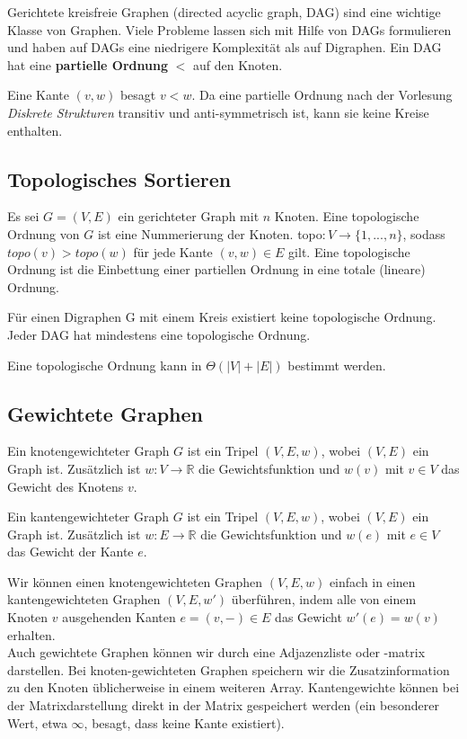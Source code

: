 \documentclass[12pt]{article}
\begin{document}
Gerichtete kreisfreie Graphen (directed acyclic graph, DAG) sind eine wichtige Klasse von Graphen. Viele Probleme lassen sich mit Hilfe von DAGs formulieren und haben auf DAGs eine niedrigere Komplexität als auf Digraphen. Ein DAG hat eine \textbf{partielle Ordnung} $<$ auf den Knoten.

Eine Kante $(v, w)$ besagt $v < w$. Da eine partielle Ordnung nach der Vorlesung \textit{Diskrete Strukturen} transitiv und anti-symmetrisch ist, kann sie keine Kreise enthalten.

\subsection{Topologisches Sortieren}

Es sei $G = (V, E)$ ein gerichteter Graph mit $n$ Knoten. Eine topologische Ordnung von $G$ ist eine Nummerierung der Knoten. topo$: V \rightarrow \{1, ..., n\}$, sodass $topo(v) > topo(w)$ für jede Kante $(v, w) \in E$ gilt. Eine topologische Ordnung ist die Einbettung einer partiellen Ordnung in eine totale (lineare) Ordnung.

Für einen Digraphen G mit einem Kreis existiert keine topologische Ordnung. Jeder DAG hat mindestens eine topologische Ordnung.

Eine topologische Ordnung kann in $\Theta(|V| + |E|)$ bestimmt werden.

\subsection{Gewichtete Graphen}

Ein knotengewichteter Graph $G$ ist ein Tripel $(V, E, w)$, wobei $(V, E)$ ein Graph ist. Zusätzlich ist $w : V \rightarrow \mathbb{R}$ die Gewichtsfunktion und $w(v)$ mit $v \in V$ das Gewicht des Knotens $v$.

Ein kantengewichteter Graph $G$ ist ein Tripel $(V, E, w)$, wobei $(V, E)$ ein Graph ist. Zusätzlich ist $w : E \rightarrow \mathbb{R}$ die Gewichtsfunktion und $w(e)$ mit $e \in V$ das Gewicht der Kante $e$.

Wir können einen knotengewichteten Graphen $(V, E, w)$ einfach in einen kantengewichteten Graphen $(V, E, w')$ überführen, indem alle von einem Knoten $v$ ausgehenden Kanten $e = (v, -) \in E$ das Gewicht $w'(e) = w(v)$ erhalten.\\

Auch gewichtete Graphen können wir durch eine Adjazenzliste oder -matrix darstellen. Bei knoten-gewichteten Graphen speichern wir die Zusatzinformation zu den Knoten üblicherweise in einem weiteren Array. Kantengewichte können bei der Matrixdarstellung direkt in der Matrix gespeichert werden (ein besonderer Wert, etwa $\infty$, besagt, dass keine Kante existiert).
\end{document}
